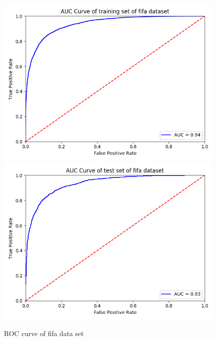 \documentclass{article}
\begin{document}
\begin{figure}[h]
  \centering
  \includegraphics[scale=0.3]{fifa_auc_train.png}
  \includegraphics[scale=0.3]{fifa_auc_test.png}
  \caption{ROC curve of fifa data set}
\end{figure}

\FloatBarrier
\end{document}
